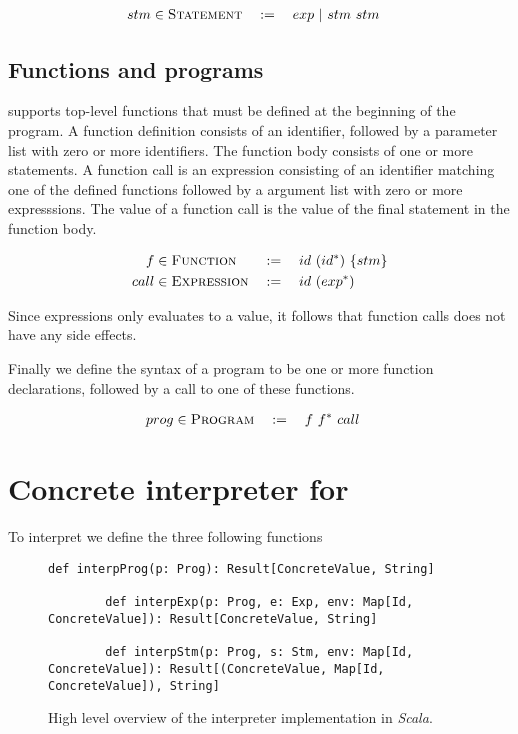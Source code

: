 \begin{alignat*}{3}
	stm & \in \textsc{Statement} && := \quad exp \alt stm \ stm
\end{alignat*}


\subsection{Functions and programs}
\explanguage supports top-level functions that must be defined at the beginning of the program. A function definition consists of an identifier, followed by a parameter list with zero or more identifiers. The function body consists of one or more statements. A function call is an expression consisting of an identifier matching one of the defined functions followed by a argument list with zero or more expresssions. The value of a function call is the value of the final statement in the function body. 

\begin{alignat*}{3}
	f & \in \textsc{Function} && := \quad id \ (id^{*}) \ \{stm\}\\
	call & \in \textsc{Expression} && := \quad id \ (exp^{*})
\end{alignat*}

Since expressions only evaluates to a value, it follows that function calls does not have any side effects.

Finally we define the syntax of a \explanguage program to be one or more function declarations, followed by a call to one of these functions. 

\begin{alignat*}{3}
	prog & \in \textsc{Program} && := \quad f \ f^{*} \ call
\end{alignat*}

\section{Concrete interpreter for \explanguage}

To interpret \explanguage we define the three following functions

\begin{figure}[!h]
	\begin{lstlisting}[style=simple]
		def interpProg(p: Prog): Result[ConcreteValue, String]
			
		def interpExp(p: Prog, e: Exp, env: Map[Id, ConcreteValue]): Result[ConcreteValue, String]
						  
		def interpStm(p: Prog, s: Stm, env: Map[Id, ConcreteValue]): Result[(ConcreteValue, Map[Id, ConcreteValue]), String]
	\end{lstlisting}
	\caption{High level overview of the interpreter implementation in \textsl{Scala}.}
\end{figure}


